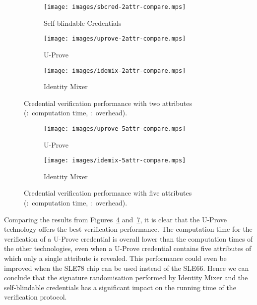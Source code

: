 \begin{figure}
  \centering
  \begin{subfigure}[b]{0.33\textwidth}
    \texttt{[image: images/sbcred-2attr-compare.mps]}
    \caption{Self-blindable Credentials}
    \label{fig:sbcred-2attr}
  \end{subfigure}
  \begin{subfigure}[b]{0.32\textwidth}
    \texttt{[image: images/uprove-2attr-compare.mps]}
    \caption{U-Prove}
    \label{fig:uprove-2attr}
  \end{subfigure}
  \begin{subfigure}[b]{0.32\textwidth}
    \texttt{[image: images/idemix-2attr-compare.mps]}
    \caption{Identity Mixer}
    \label{fig:idemix-2attr}
  \end{subfigure}

  \caption[Credential verification performance with two attributes.]{
    Credential verification performance with two attributes
    (:~computation time,
      :~overhead).}
  \label{fig:2attr-comparison}
\end{figure}

\begin{figure}
  \centering
  \begin{subfigure}[b]{0.48\textwidth}
    \texttt{[image: images/uprove-5attr-compare.mps]}
    \caption{U-Prove}
    \label{fig:uprove-5attr}
  \end{subfigure}
  \begin{subfigure}[b]{0.48\textwidth}
    \texttt{[image: images/idemix-5attr-compare.mps]}
    \caption{Identity Mixer}
    \label{fig:idemix-5attr}
  \end{subfigure}

  \caption[Credential verification performance with five attributes.]{
    Credential verification performance with five attributes
    (:~computation time,
      :~overhead).}
  \label{fig:5attr-comparison}
\end{figure}

Comparing the results from Figures~\ref{fig:2attr-comparison}
and~\ref{fig:5attr-comparison}, it is clear that the U-Prove technology offers
the best verification performance. The computation time for the verification of
a U-Prove credential is overall lower than the computation times of the other
technologies, even when a U-Prove credential contains five attributes of which
only a single attribute is revealed. This performance could even be improved
when the SLE78 chip can be used instead of the SLE66. Hence we can conclude that
the signature randomisation performed by Identity Mixer and the self-blindable
credentials has a significant impact on the running time of the verification
protocol.

